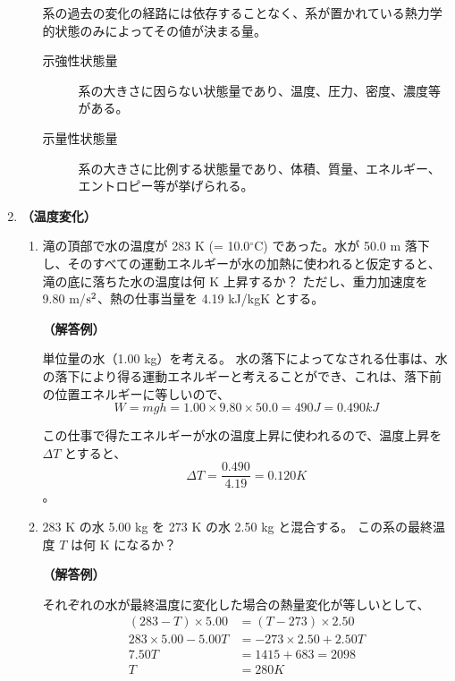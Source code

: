 \documentclass[uplatex,dvipdfmx,a4paper,11pt]{jsarticle}
\begin{document}
\begin{appendix}
\begin{enumerate}
\begin{enumerate}
系の過去の変化の経路には依存することなく、系が置かれている熱力学的状態のみによってその値が決まる量。

\begin{description}
\item[示強性状態量]
系の大きさに因らない状態量であり、温度、圧力、密度、濃度等がある。
\item[示量性状態量]
系の大きさに比例する状態量であり、体積、質量、エネルギー、エントロピー等が挙げられる。
\end{description}

\end{enumerate}

\item
{\bf （温度変化）}

\begin{enumerate}
\item
滝の頂部で水の温度が 283 K (= 10.0${}^\circ$C) であった。水が 50.0 m 落下し、そのすべての運動エネルギーが水の加熱に使われると仮定すると、滝の底に落ちた水の温度は何 K 上昇するか？
ただし、重力加速度を 9.80 m/${\rm s}^2$、熱の仕事当量を 4.19 kJ/kgK とする。

{\bf （解答例）}

単位量の水（1.00 kg）を考える。
水の落下によってなされる仕事は、水の落下により得る運動エネルギーと考えることができ、これは、落下前の位置エネルギーに等しいので、
\begin{equation*}
W = mgh = 1.00 \times 9.80 \times 50.0 = 490 J = 0.490 kJ
\end{equation*}

この仕事で得たエネルギーが水の温度上昇に使われるので、温度上昇を $\Delta T$ とすると、
\begin{equation*}
\Delta T = \dfrac{0.490}{4.19} = 0.120 K
\end{equation*}。

\item
283 K の水 5.00 kg を 273 K の水 2.50 kg と混合する。
この系の最終温度 $T$ は何 K になるか？

{\bf （解答例）}

それぞれの水が最終温度に変化した場合の熱量変化が等しいとして、
\begin{align*}
(283 - T) \times 5.00 &= (T - 273) \times 2.50 \\
283\times5.00 - 5.00 T &=  -273\times2.50 + 2.50 T \\
7.50T &= 1415 + 683 = 2098 \\
T &= 280 K
\end{align*}


\end{enumerate}
\end{enumerate}
\end{appendix}
\end{document}

